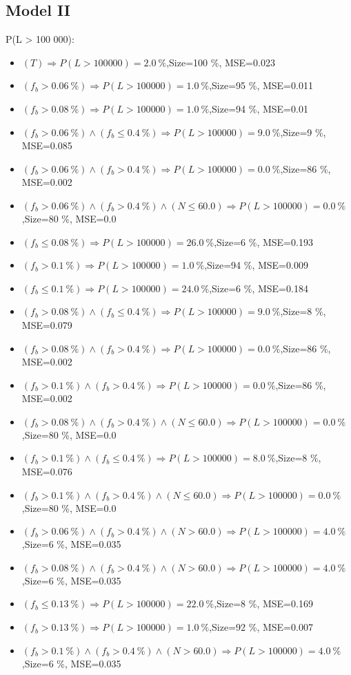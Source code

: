 \documentclass[numbered]{CSL}
\begin{document}
\subsection{Model II}
P(L > 100 000):
\begin{itemize}
\item $(T) \Rightarrow P(L > 100 000) = 2.0~\%$,\hfill Size=100 \%, MSE=0.023
\item $(f_b > 0.06~\%) \Rightarrow P(L > 100 000) = 1.0~\%$,\hfill Size=95 \%, MSE=0.011
\item $(f_b > 0.08~\%) \Rightarrow P(L > 100 000) = 1.0~\%$,\hfill Size=94 \%, MSE=0.01
\item $(f_b > 0.06~\%) \land (f_b \leq 0.4~\%) \Rightarrow P(L > 100 000) = 9.0~\%$,\hfill Size=9 \%, MSE=0.085
\item $(f_b > 0.06~\%) \land (f_b > 0.4~\%) \Rightarrow P(L > 100 000) = 0.0~\%$,\hfill Size=86 \%, MSE=0.002
\item $(f_b > 0.06~\%) \land (f_b > 0.4~\%) \land (N \leq 60.0) \Rightarrow P(L > 100 000) = 0.0~\%$,\hfill Size=80 \%, MSE=0.0
\item $(f_b \leq 0.08~\%) \Rightarrow P(L > 100 000) = 26.0~\%$,\hfill Size=6 \%, MSE=0.193
\item $(f_b > 0.1~\%) \Rightarrow P(L > 100 000) = 1.0~\%$,\hfill Size=94 \%, MSE=0.009
\item $(f_b \leq 0.1~\%) \Rightarrow P(L > 100 000) = 24.0~\%$,\hfill Size=6 \%, MSE=0.184
\item $(f_b > 0.08~\%) \land (f_b \leq 0.4~\%) \Rightarrow P(L > 100 000) = 9.0~\%$,\hfill Size=8 \%, MSE=0.079
\item $(f_b > 0.08~\%) \land (f_b > 0.4~\%) \Rightarrow P(L > 100 000) = 0.0~\%$,\hfill Size=86 \%, MSE=0.002
\item $(f_b > 0.1~\%) \land (f_b > 0.4~\%) \Rightarrow P(L > 100 000) = 0.0~\%$,\hfill Size=86 \%, MSE=0.002
\item $(f_b > 0.08~\%) \land (f_b > 0.4~\%) \land (N \leq 60.0) \Rightarrow P(L > 100 000) = 0.0~\%$,\hfill Size=80 \%, MSE=0.0
\item $(f_b > 0.1~\%) \land (f_b \leq 0.4~\%) \Rightarrow P(L > 100 000) = 8.0~\%$,\hfill Size=8 \%, MSE=0.076
\item $(f_b > 0.1~\%) \land (f_b > 0.4~\%) \land (N \leq 60.0) \Rightarrow P(L > 100 000) = 0.0~\%$,\hfill Size=80 \%, MSE=0.0
\item $(f_b > 0.06~\%) \land (f_b > 0.4~\%) \land (N > 60.0) \Rightarrow P(L > 100 000) = 4.0~\%$,\hfill Size=6 \%, MSE=0.035
\item $(f_b > 0.08~\%) \land (f_b > 0.4~\%) \land (N > 60.0) \Rightarrow P(L > 100 000) = 4.0~\%$,\hfill Size=6 \%, MSE=0.035
\item $(f_b \leq 0.13~\%) \Rightarrow P(L > 100 000) = 22.0~\%$,\hfill Size=8 \%, MSE=0.169
\item $(f_b > 0.13~\%) \Rightarrow P(L > 100 000) = 1.0~\%$,\hfill Size=92 \%, MSE=0.007
\item $(f_b > 0.1~\%) \land (f_b > 0.4~\%) \land (N > 60.0) \Rightarrow P(L > 100 000) = 4.0~\%$,\hfill Size=6 \%, MSE=0.035
\end{itemize}
\end{document}
